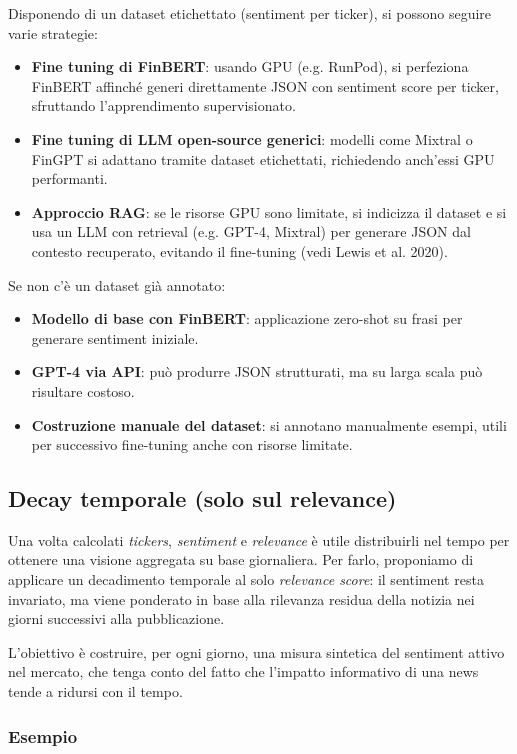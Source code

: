 \documentclass[a4paper,12pt]{article}
\begin{document}
Disponendo di un dataset etichettato (sentiment per ticker), si possono seguire varie strategie:

\begin{itemize}
  \item \textbf{Fine tuning di FinBERT}: usando GPU (e.g. RunPod), si perfeziona FinBERT affinché generi direttamente JSON con sentiment score per ticker, sfruttando l’apprendimento supervisionato.
  \item \textbf{Fine tuning di LLM open-source generici}: modelli come Mixtral o FinGPT si adattano tramite dataset etichettati, richiedendo anch’essi GPU performanti.
  \item \textbf{Approccio RAG}: se le risorse GPU sono limitate, si indicizza il dataset e si usa un LLM con retrieval (e.g. GPT-4, Mixtral) per generare JSON dal contesto recuperato, evitando il fine-tuning (vedi Lewis et al. 2020).
\end{itemize}

Se non c’è un dataset già annotato:

\begin{itemize}
  \item \textbf{Modello di base con FinBERT}: applicazione zero-shot su frasi per generare sentiment iniziale.
  \item \textbf{GPT-4 via API}: può produrre JSON strutturati, ma su larga scala può risultare costoso.
  \item \textbf{Costruzione manuale del dataset}: si annotano manualmente esempi, utili per successivo fine-tuning anche con risorse limitate.
\end{itemize}
\subsection{Decay temporale (solo sul relevance)}

Una volta calcolati \textit{tickers}, \textit{sentiment} e \textit{relevance} è utile distribuirli nel tempo per ottenere una visione aggregata su base giornaliera.  
Per farlo, proponiamo di applicare un decadimento temporale al solo \textit{relevance score}: il sentiment resta invariato, ma viene ponderato in base alla rilevanza residua della notizia nei giorni successivi alla pubblicazione.

L’obiettivo è costruire, per ogni giorno, una misura sintetica del sentiment attivo nel mercato, che tenga conto del fatto che l’impatto informativo di una news tende a ridursi con il tempo.

\subsubsection*{Esempio}
\end{document}
